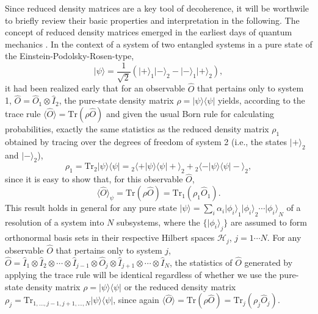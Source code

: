\documentclass[twocolumn,rmp,aps,amsmath,amsfonts,noshowkeys,noshowpacs]{revtex4}
\newcommand{\ket}[1]{\ensuremath{|{#1\rangle}}}
\newcommand{\bra}[1]{\ensuremath{{\langle #1}|}}
\begin{document}
Since reduced density matrices are a key tool of decoherence, it will
be worthwile to briefly review their basic properties and
interpretation in the following.  The concept of reduced density
matrices emerged in the earliest days of quantum mechanics
\citetext{\citealp{Landau:1927:uy,Neumann:1932:gq,Furry:1936:pp}; for
  some historical remarks, see \citealp{Pessoa:1998:yl}}. In the
context of a system of two entangled systems in a pure state of the
Einstein-Podolsky-Rosen-type,
%
\begin{equation} \label{eq:epr}
\ket{\psi} = \frac{1}{\sqrt{2}}(\ket{+}_1\ket{-}_2 -
\ket{-}_1\ket{+}_2),
\end{equation}
%
it had been realized early that for an observable $\widehat{O}$ that
pertains only to system 1, $\widehat{O}=\widehat{O}_1 \otimes
\widehat{I}_2$, the pure-state density matrix $\rho =
\ket{\psi}\bra{\psi}$ yields, according to the trace rule $\langle
\widehat{O} \rangle = \text{Tr} (\rho \widehat{O})$ and given the
usual Born rule for calculating probabilities, exactly the same
statistics as the reduced density matrix $\rho_1$ obtained by
tracing over the degrees of freedom of system 2 (i.e., the states
$\ket{+}_2$ and $\ket{-}_2$),
%
\begin{equation} \label{eq:epr-rho}
\rho_1 = \text{Tr}_2 \ket{\psi}\bra{\psi} = {_2\langle +} | \psi 
\rangle \langle \psi | + \rangle_2 + {_2\langle -} | \psi 
\rangle \langle \psi | - \rangle_2,
\end{equation}
%
since it is easy to show that, for this observable $\widehat{O}$,
%
\begin{equation}
\langle \widehat{O} \rangle_{\psi} = \text{Tr} (\rho
\widehat{O}) = \text{Tr}_1 (\rho_1 \widehat{O}_1). 
\end{equation}
%
This result holds in general for any pure state $\ket{\psi} = \sum_i
\alpha_i \ket{\phi_i}_1 \ket{\phi_i}_2 \cdots \ket{\phi_i}_N$ of a
resolution of a system into $N$ subsystems, where the $\{
\ket{\phi_i}_j \}$ are assumed to form orthonormal basis sets in their
respective Hilbert spaces $\mathcal{H}_j$, $j=1 \cdots N$.  For any
observable $\widehat{O}$ that pertains only to system $j$,
$\widehat{O}=\widehat{I}_1 \otimes \widehat{I}_2 \otimes \cdots
\otimes \widehat{I}_{j-1} \otimes \widehat{O}_j \otimes
\widehat{I}_{j+1} \otimes \cdots \otimes \widehat{I}_N$, the
statistics of $\widehat{O}$ generated by applying the trace rule will
be identical regardless of whether we use the pure-state density matrix
$\rho = \ket{\psi} \bra{\psi}$ or the reduced density matrix $\rho_j =
\text{Tr}_{1, \hdots, j-1, j+1, \hdots, N} \ket{\psi} \bra{\psi}$,
since again $\langle \widehat{O} \rangle = \text{Tr} (\rho
\widehat{O}) = \text{Tr}_j (\rho_j \widehat{O}_j)$.
\end{document}
